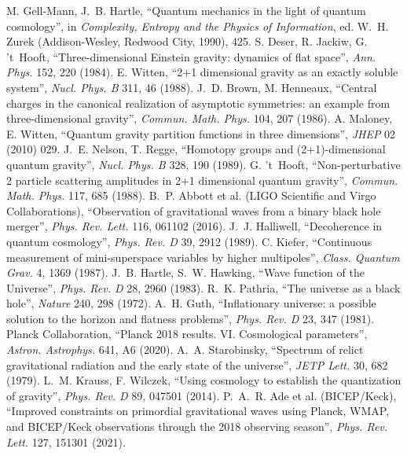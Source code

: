 M. Gell-Mann, J.~B. Hartle, ``Quantum mechanics in the light of quantum cosmology'', in \emph{Complexity, Entropy
and the Physics of Information}, ed. W.~H. Zurek (Addison-Wesley, Redwood City, 1990), 425.
 S. Deser, R. Jackiw, G. 't~Hooft, ``Three-dimensional Einstein gravity: dynamics of flat space'', \emph{Ann. Phys.} 152, 220
(1984).
 E. Witten, ``2+1 dimensional gravity as an exactly soluble system'', \emph{Nucl. Phys. B} 311, 46 (1988).
 J.~D. Brown, M. Henneaux, ``Central charges in the canonical realization of asymptotic symmetries: an example from
three-dimensional gravity'', \emph{Commun. Math. Phys.} 104, 207 (1986).
 A. Maloney, E. Witten, ``Quantum gravity partition functions in three dimensions'', \emph{JHEP} 02 (2010) 029.
 J.~E. Nelson, T. Regge, ``Homotopy groups and (2+1)-dimensional quantum gravity'', \emph{Nucl. Phys. B} 328, 190 (1989).
 G. 't~Hooft, ``Non-perturbative 2 particle scattering amplitudes in 2+1 dimensional quantum gravity'',
\emph{Commun. Math. Phys.} 117, 685 (1988).
 B.~P. Abbott et al. (LIGO Scientific and Virgo Collaborations), ``Observation of gravitational waves from a binary black
hole merger'', \emph{Phys. Rev. Lett.} 116, 061102 (2016).
 J.~J. Halliwell, ``Decoherence in quantum cosmology'', \emph{Phys. Rev. D} 39, 2912 (1989).
 C. Kiefer, ``Continuous measurement of mini-superspace variables by higher multipoles'', \emph{Class. Quantum Grav.} 4,
1369 (1987).
 J.~B. Hartle, S.~W. Hawking, ``Wave function of the Universe'', \emph{Phys. Rev. D} 28, 2960 (1983).
 R.~K. Pathria, ``The universe as a black hole'', \emph{Nature} 240, 298 (1972).
 A.~H. Guth, ``Inflationary universe: a possible solution to the horizon and flatness problems'', \emph{Phys. Rev. D} 23, 347
(1981).
 Planck Collaboration, ``Planck 2018 results. VI. Cosmological parameters'', \emph{Astron. Astrophys.} 641, A6 (2020).
 A.~A. Starobinsky, ``Spectrum of relict gravitational radiation and the early state of the universe'', \emph{JETP
Lett.} 30, 682 (1979).
 L.~M. Krauss, F. Wilczek, ``Using cosmology to establish the quantization of gravity'', \emph{Phys. Rev. D} 89,
047501 (2014).
 P.~A.~R. Ade et al. (BICEP/Keck), ``Improved constraints on primordial gravitational waves using Planck, WMAP, and BICEP/Keck
observations through the 2018 observing season'', \emph{Phys. Rev. Lett.} 127, 151301 (2021).

